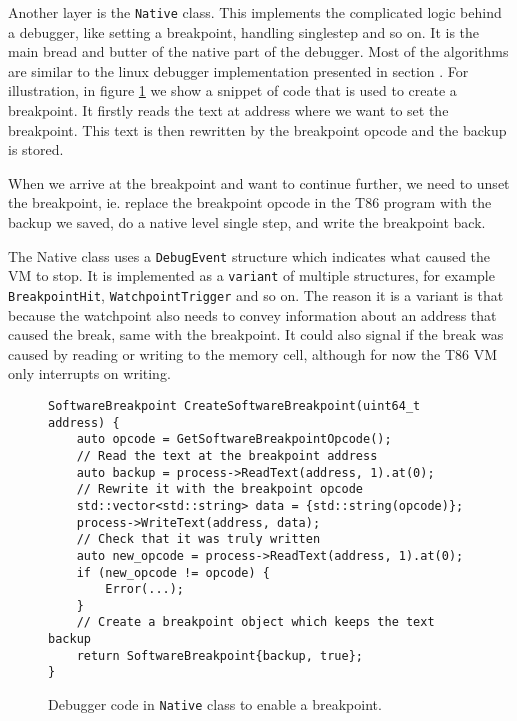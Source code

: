 Another layer is the \texttt{Native} class. This implements the complicated
logic behind a debugger, like setting a breakpoint, handling singlestep and so
on. It is the main bread and butter of the native part of the debugger. Most of
the algorithms are similar to the linux debugger implementation presented in
section . For illustration, in figure \ref{t86dbg:breakpoint} we show
a snippet of code that is used to create a breakpoint. It firstly reads the
text at address where we want to set the breakpoint. This text is then
rewritten by the breakpoint opcode and the backup is stored.

When we arrive at the breakpoint and want to continue further, we need to unset
the breakpoint, ie. replace the breakpoint opcode in the T86 program with the
backup we saved, do a native level single step, and write the breakpoint back.

The Native class uses a \texttt{DebugEvent} structure which indicates what
caused the VM to stop. It is implemented as a \texttt{variant} of multiple
structures, for example \texttt{BreakpointHit}, \texttt{WatchpointTrigger} and
so on. The reason it is a variant is that because the watchpoint also needs to
convey information about an address that caused the break, same with the
breakpoint. It could also signal if the break was caused by reading or writing
to the memory cell, although for now the T86 VM only interrupts on writing.

\begin{figure}
    \begin{verbatim}
SoftwareBreakpoint CreateSoftwareBreakpoint(uint64_t address) {
    auto opcode = GetSoftwareBreakpointOpcode();
    // Read the text at the breakpoint address
    auto backup = process->ReadText(address, 1).at(0);
    // Rewrite it with the breakpoint opcode
    std::vector<std::string> data = {std::string(opcode)};
    process->WriteText(address, data);
    // Check that it was truly written
    auto new_opcode = process->ReadText(address, 1).at(0);
    if (new_opcode != opcode) {
        Error(...);
    }
    // Create a breakpoint object which keeps the text backup
    return SoftwareBreakpoint{backup, true};
}
    \end{verbatim}
    \caption{Debugger code in \texttt{Native} class to enable a breakpoint.}
    \label{t86dbg:breakpoint}
\end{figure}

